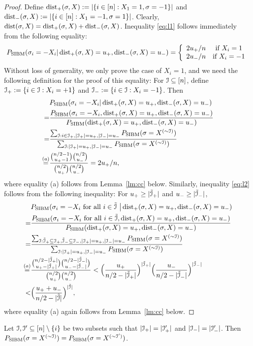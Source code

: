 \documentclass{article}
\begin{document}
\begin{proof}
Define $\operatorname{dist}_+(\sigma,X):=|\{i\in[n]:X_1=1, \sigma=-1\}|$ and $\operatorname{dist}_-(\sigma,X):=|\{i\in[n]:X_1=-1, \sigma=1\}|$. Clearly, $\operatorname{dist}(\sigma,X)=\operatorname{dist}_+(\sigma,X)+\operatorname{dist}_-(\sigma,X)$. Inequality \eqref{eq:l1} follows immediately from the following equality:
$$
P_{\operatorname{SIBM}}(\sigma_i=-X_i|
\operatorname{dist}_+(\sigma,X)=u_+,
\operatorname{dist}_-(\sigma,X)=u_-) 
=\left\{
\begin{array}{cc}
  2u_+/n   & \mbox{if~} X_i=1 \\
  2u_-/n   & \mbox{if~} X_i=-1
\end{array}
\right.
$$
Without loss of generality,
we only prove the case of $X_i=1$, and
we need the following definition for the proof of this equality:
For $\mathcal{I}\subseteq[n]$, define $\mathcal{I}_+:=\{i\in\mathcal{I}:X_i=+1\}$ and $\mathcal{I}_-:=\{i\in\mathcal{I}:X_i=-1\}$.
Then
\begin{align*}
& P_{\operatorname{SIBM}}(\sigma_i=-X_i|
\operatorname{dist}_+(\sigma,X)=u_+,
\operatorname{dist}_-(\sigma,X)=u_-)  \\
= & \frac{P_{\operatorname{SIBM}}(\sigma_i=-X_i ,
\operatorname{dist}_+(\sigma,X)=u_+,
\operatorname{dist}_-(\sigma,X)=u_-)}{P_{\operatorname{SIBM}}(
\operatorname{dist}_+(\sigma,X)=u_+,
\operatorname{dist}_-(\sigma,X)=u_-)} \\
= & \frac{\sum_{\mathcal{I}:i\in\mathcal{I}_+,|\mathcal{I}_+|=u_+,|\mathcal{I}_-|=u_-}P_{\operatorname{SIBM}}(\sigma=X^{(\sim\mathcal{I})}) }
{\sum_{\mathcal{I}:|\mathcal{I}_+|=u_+,|\mathcal{I}_-|=u_-}P_{\operatorname{SIBM}}(\sigma=X^{(\sim\mathcal{I})}) } \\
\overset{(a)}{=} & \frac{\binom{n/2-1}{u_+ -1} \binom{n/2}{u_-}}
{\binom{n/2}{u_+} \binom{n/2}{u_-}}
= 2u_+/n ,
\end{align*}
where equality (a) follows from Lemma~\ref{lm:cc} below.
Similarly, inequality \eqref{eq:l2} follows from the following inequality:
For $u_+\ge |\tilde{\mathcal{I}}_+|$ and $u_-\ge |\tilde{\mathcal{I}}_-|$,
\begin{align*}
& P_{\operatorname{SIBM}}(\sigma_i=-X_i \text{~for all~}  i\in\tilde{\mathcal{I}} ~ \big|
\operatorname{dist}_+(\sigma,X)=u_+,
\operatorname{dist}_-(\sigma,X)=u_-)  \\
= & \frac{P_{\operatorname{SIBM}}(\sigma_i=-X_i \text{~for all~}  i\in\tilde{\mathcal{I}} ,
\operatorname{dist}_+(\sigma,X)=u_+,
\operatorname{dist}_-(\sigma,X)=u_-)}{P_{\operatorname{SIBM}}(
\operatorname{dist}_+(\sigma,X)=u_+,
\operatorname{dist}_-(\sigma,X)=u_-)} \\
= & \frac{\sum_{\mathcal{I}:\tilde{\mathcal{I}}_+\subseteq\mathcal{I}_+,
\tilde{\mathcal{I}}_-\subseteq\mathcal{I}_-,
|\mathcal{I}_+|=u_+,|\mathcal{I}_-|=u_-}P_{\operatorname{SIBM}}(\sigma=X^{(\sim\mathcal{I})}) }
{\sum_{\mathcal{I}:|\mathcal{I}_+|=u_+,|\mathcal{I}_-|=u_-}P_{\operatorname{SIBM}}(\sigma=X^{(\sim\mathcal{I})}) }  \\
\overset{(a)}{=} & \frac{\binom{n/2-|\tilde{\mathcal{I}}_+|}{u_+ -|\tilde{\mathcal{I}}_+|} \binom{n/2 - |\tilde{\mathcal{I}}_-|}{u_- - |\tilde{\mathcal{I}}_-|}}
{\binom{n/2}{u_+} \binom{n/2}{u_-}}
< \Big(\frac{u_+}{n/2- |\tilde{\mathcal{I}}_+|} \Big)^{|\tilde{\mathcal{I}}_+|}
\Big(\frac{u_-}{n/2- |\tilde{\mathcal{I}}_-|} \Big)^{|\tilde{\mathcal{I}}_-|} \\
< & \Big(\frac{u_+ + u_-}{n/2- |\tilde{\mathcal{I}}|} \Big)^{|\tilde{\mathcal{I}}|}  ,
\end{align*}
where equality (a) again follows from Lemma~\ref{lm:cc} below.
\end{proof}







\begin{lemma} \label{lm:cc}
Let $\mathcal{I},\mathcal{I}'\subseteq[n]\setminus\{i\}$ be two subsets such that $|\mathcal{I}_+|=|\mathcal{I}_+'|$ and $|\mathcal{I}_-|=|\mathcal{I}_-'|$. 
Then $P_{\operatorname{SIBM}}(\sigma=X^{(\sim\mathcal{I})}) = P_{\operatorname{SIBM}}(\sigma=X^{(\sim\mathcal{I}')})$.
\end{lemma}
\end{document}
